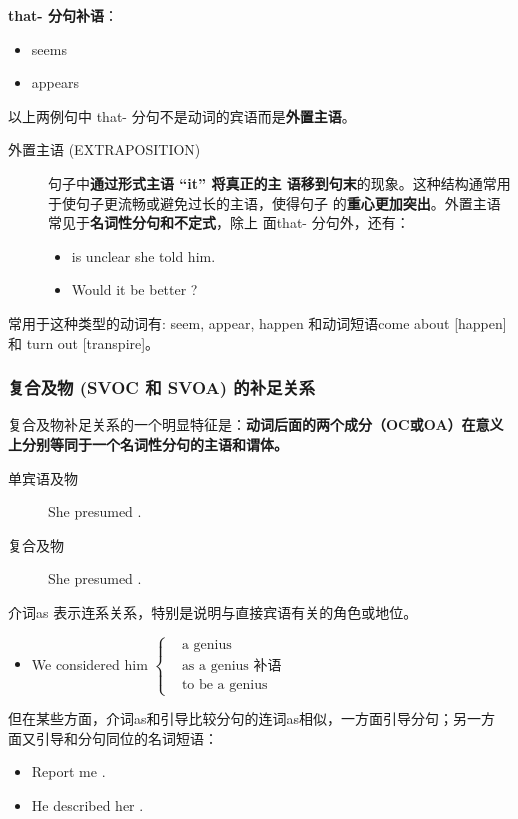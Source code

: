 \textbf{that- 分句补语}：
\begin{itemize}
\item {} seems 
\item {} appears 
\end{itemize}
以上两例句中 that- 分句不是动词的宾语而是\textbf{外置主语}。
\begin{description}
\item[外置主语 (EXTRAPOSITION)] 句子中\textbf{通过形式主语 “it” 将真正的主
    语移到句末}的现象。这种结构通常用于使句子更流畅或避免过长的主语，使得句子
  的\textbf{重心更加突出}。外置主语常见于\textbf{名词性分句和不定式}，除上
  面that- 分句外，还有：
  \begin{itemize}
  \item {} is unclear  she told him.

  \item Would it be better ?
  \end{itemize}
\end{description}
常用于这种类型的动词有: seem, appear, happen 和动词短语come about
[happen]和 turn out [transpire]。

\subsubsection{复合及物 (SVOC 和 SVOA) 的补足关系}

复合及物补足关系的一个明显特征是：\textbf{动词后面的两个成分（OC或OA）在意义
  上分别等同于一个名词性分句的主语和谓体。}
\begin{description}
\item[单宾语及物] She presumed .
\item[复合及物] She presumed .
\end{description}

介词as 表示连系关系，特别是说明与直接宾语有关的角色或地位。
\begin{itemize}
\item We considered him $ \left\{
    \begin{aligned}
      &\text{a genius} \\
      &\text{as a genius 补语} \\
      &\text{to be a genius}
    \end{aligned}
  \right. $
\end{itemize}
但在某些方面，介词as和引导比较分句的连词as相似，一方面引导分句；另一方
面又引导和分句同位的名词短语：
\begin{itemize}
\item Report me .

\item He described her .
\end{itemize}


